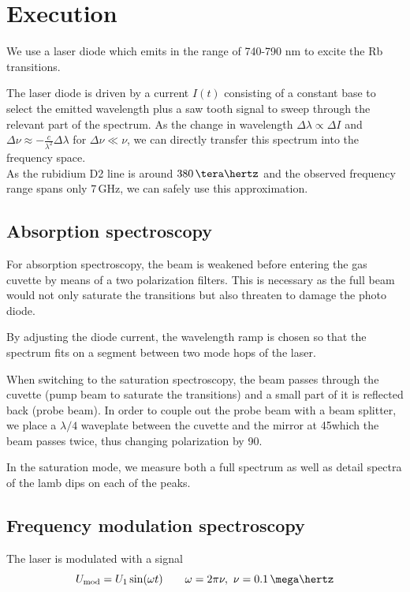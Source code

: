 
\section{Execution} %

We use a laser diode which emits in the range of 740-790 nm \cite{lit:diode} to excite the \textsf{Rb} transitions.

The laser diode is driven by a current $I(t)$ consisting of a constant base to select the emitted wavelength plus a saw tooth signal to sweep through the relevant part of the spectrum. As the change in wavelength $\Delta \lambda \propto \Delta I$ and $\Delta \nu \approx - \frac{c}{\lambda^2}\Delta \lambda$ for $\Delta \nu \ll \nu$, we can directly transfer this spectrum into the frequency space.\\
As the rubidium D2 line is around $380 \,\tera\hertz$ and the observed frequency range spans only 7\,GHz, we can safely use this approximation.

\subsection{Absorption spectroscopy}

For absorption spectroscopy, the beam is weakened before entering the gas cuvette by means of a two polarization filters. This is necessary as the full beam would not only saturate the transitions but also threaten to damage the photo diode.

By adjusting the diode current, the wavelength ramp is chosen so that the spectrum fits on a segment between two mode hops of the laser.

When switching to the saturation spectroscopy, the beam passes through the cuvette (pump beam to saturate the transitions) and a small part of it is reflected back (probe beam). In order to couple out the probe beam with a beam splitter, we place a $\lambda/4$ waveplate between the cuvette and the mirror at 45\degree which the beam passes twice, thus changing polarization by 90\degree.

In the saturation mode, we measure both a full spectrum as well as detail spectra of the lamb dips on each of the peaks.

\subsection{Frequency modulation spectroscopy}
The laser is modulated with a signal
\begin{equation}
 U_\text{mod} = U_1 \sin(\omega t) \qquad \omega = 2 \pi \nu,~ \nu = 0.1\,\mega\hertz
\end{equation}

